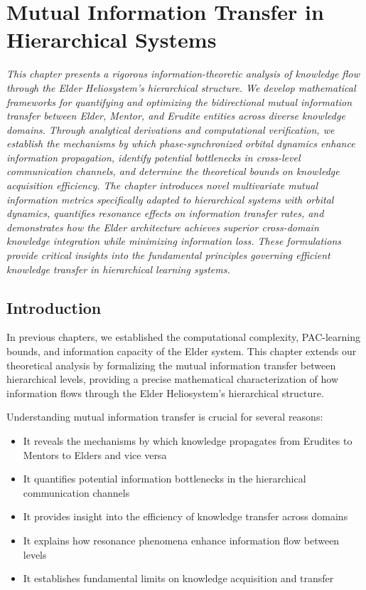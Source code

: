 \chapter{Mutual Information Transfer in Hierarchical Systems}

\textit{This chapter presents a rigorous information-theoretic analysis of knowledge flow through the Elder Heliosystem's hierarchical structure. We develop mathematical frameworks for quantifying and optimizing the bidirectional mutual information transfer between Elder, Mentor, and Erudite entities across diverse knowledge domains. Through analytical derivations and computational verification, we establish the mechanisms by which phase-synchronized orbital dynamics enhance information propagation, identify potential bottlenecks in cross-level communication channels, and determine the theoretical bounds on knowledge acquisition efficiency. The chapter introduces novel multivariate mutual information metrics specifically adapted to hierarchical systems with orbital dynamics, quantifies resonance effects on information transfer rates, and demonstrates how the Elder architecture achieves superior cross-domain knowledge integration while minimizing information loss. These formulations provide critical insights into the fundamental principles governing efficient knowledge transfer in hierarchical learning systems.}

\section{Introduction}

In previous chapters, we established the computational complexity, PAC-learning bounds, and information capacity of the Elder system. This chapter extends our theoretical analysis by formalizing the mutual information transfer between hierarchical levels, providing a precise mathematical characterization of how information flows through the Elder Heliosystem's hierarchical structure.

Understanding mutual information transfer is crucial for several reasons:

\begin{itemize}
    \item It reveals the mechanisms by which knowledge propagates from Erudites to Mentors to Elders and vice versa
    \item It quantifies potential information bottlenecks in the hierarchical communication channels
    \item It provides insight into the efficiency of knowledge transfer across domains
    \item It explains how resonance phenomena enhance information flow between levels
    \item It establishes fundamental limits on knowledge acquisition and transfer
\end{itemize}

